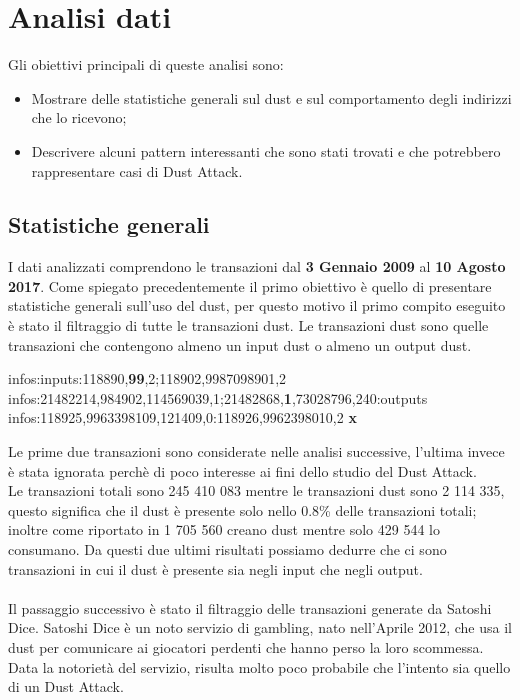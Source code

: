 \chapter{Analisi dati}
Gli obiettivi principali di queste analisi sono:
\begin{itemize}
    \item Mostrare delle statistiche generali sul dust e sul comportamento degli indirizzi che lo ricevono;
    \item Descrivere alcuni pattern interessanti che sono stati trovati e che potrebbero rappresentare casi di Dust Attack.
\end{itemize}
\section{Statistiche generali}
I dati analizzati comprendono le transazioni dal \textbf{3 Gennaio 2009} al \textbf{10 Agosto 2017}.
Come spiegato precedentemente il primo obiettivo è quello di presentare statistiche generali sull'uso del dust, per questo motivo il primo compito eseguito è stato il filtraggio di tutte le transazioni dust. Le transazioni dust sono quelle transazioni che contengono almeno un input dust o almeno un output dust.
\begin{mdframed}
 infos:inputs:118890,\textbf{99},2;118902,9987098901,2 \checkmark\\
 infos:21482214,984902,114569039,1;21482868,\textbf{1},73028796,240:outputs \checkmark\\
 infos:118925,9963398109,121409,0:118926,9962398010,2 \textbf{x}
\end{mdframed}
Le prime due transazioni sono considerate nelle analisi successive, l'ultima invece è stata ignorata perchè di poco interesse ai fini dello studio del Dust Attack.\\
Le transazioni totali sono 245 410 083 mentre le transazioni dust sono 2 114 335, questo significa che il dust è presente solo nello 0.8\% delle transazioni totali; inoltre come riportato in\cite{dustAnalisi} 1 705 560 creano dust mentre solo 429 544 lo consumano. Da questi due ultimi risultati possiamo dedurre che ci sono transazioni in cui il dust è presente sia negli input che negli output.\\\\
Il passaggio successivo è stato il filtraggio delle transazioni generate da Satoshi Dice. Satoshi Dice\cite{SD} è un noto servizio di gambling, nato nell'Aprile 2012, che usa il dust per comunicare ai giocatori perdenti che hanno perso la loro scommessa. Data la notorietà del servizio, risulta molto poco probabile che l'intento sia quello di un Dust Attack.\\
